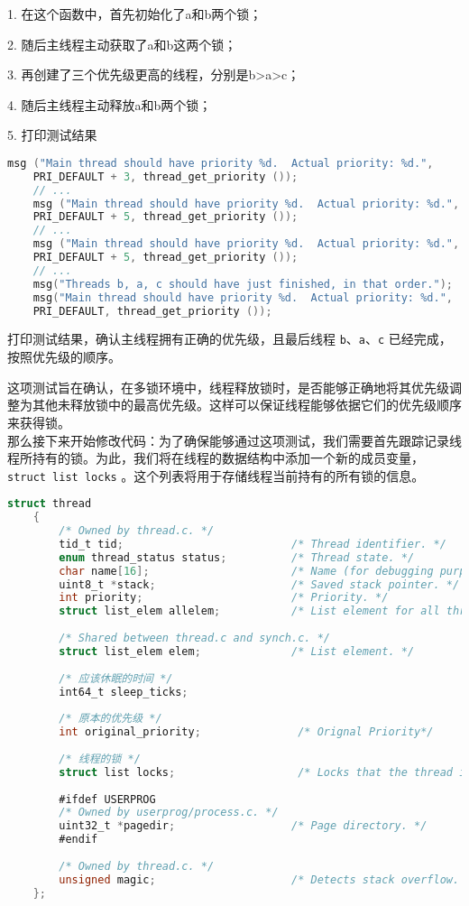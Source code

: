 \documentclass{article}
\begin{document}
	1. 在这个函数中，首先初始化了a和b两个锁；
	
	2. 随后主线程主动获取了a和b这两个锁；
	
	3. 再创建了三个优先级更高的线程，分别是b>a>c；
	
	4. 随后主线程主动释放a和b两个锁；
	
	5. 打印测试结果
	
	\begin{lstlisting}[language=C,title=打印测试结果]
    msg ("Main thread should have priority %d.  Actual priority: %d.",
    PRI_DEFAULT + 3, thread_get_priority ());
    // ...
    msg ("Main thread should have priority %d.  Actual priority: %d.",
    PRI_DEFAULT + 5, thread_get_priority ());
    // ...
    msg ("Main thread should have priority %d.  Actual priority: %d.",
    PRI_DEFAULT + 5, thread_get_priority ());
    // ...
    msg("Threads b, a, c should have just finished, in that order.");
    msg("Main thread should have priority %d.  Actual priority: %d.",
    PRI_DEFAULT, thread_get_priority ());
	\end{lstlisting}
	
	打印测试结果，确认主线程拥有正确的优先级，且最后线程 \texttt{b}、\texttt{a}、\texttt{c} 已经完成，按照优先级的顺序。
	
	这项测试旨在确认，在多锁环境中，线程释放锁时，是否能够正确地将其优先级调整为其他未释放锁中的最高优先级。这样可以保证线程能够依据它们的优先级顺序来获得锁。\\[1em]
	
	那么接下来开始修改代码：为了确保能够通过这项测试，我们需要首先跟踪记录线程所持有的锁。为此，我们将在线程的数据结构中添加一个新的成员变量， \texttt{struct list locks} 。这个列表将用于存储线程当前持有的所有锁的信息。
	
	\begin{lstlisting}[language=C, title=修改后的线程结构体]
    struct thread
    {
    	/* Owned by thread.c. */
    	tid_t tid;                          /* Thread identifier. */
    	enum thread_status status;          /* Thread state. */
    	char name[16];                      /* Name (for debugging purposes). */
    	uint8_t *stack;                     /* Saved stack pointer. */
    	int priority;                       /* Priority. */
    	struct list_elem allelem;           /* List element for all threads list. */
    	
    	/* Shared between thread.c and synch.c. */
    	struct list_elem elem;              /* List element. */
    	
    	/* 应该休眠的时间 */
    	int64_t sleep_ticks;
    	
    	/* 原本的优先级 */
    	int original_priority;               /* Orignal Priority*/
    	
    	/* 线程的锁 */
    	struct list locks;                   /* Locks that the thread is holding */
    	
    	#ifdef USERPROG
    	/* Owned by userprog/process.c. */
    	uint32_t *pagedir;                  /* Page directory. */
    	#endif
    	
    	/* Owned by thread.c. */
    	unsigned magic;                     /* Detects stack overflow. */
    };
	\end{lstlisting}
	
\end{document}
